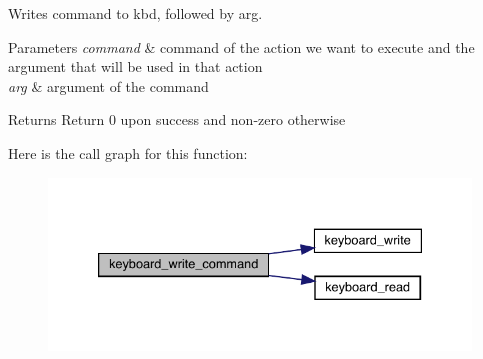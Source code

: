 Writes command to kbd, followed by arg. 


\begin{DoxyParams}{Parameters}
{\em command} & command of the action we want to execute and the argument that will be used in that action \\
\hline
{\em arg} & argument of the command\\
\hline
\end{DoxyParams}
\begin{DoxyReturn}{Returns}
Return 0 upon success and non-\/zero otherwise 
\end{DoxyReturn}
Here is the call graph for this function\+:\nopagebreak
\begin{figure}[H]
\begin{center}
\leavevmode
\includegraphics[width=333pt]{group__keyboard_ga279ddeca4cafee5084a0eec40e28d223_cgraph}
\end{center}
\end{figure}
